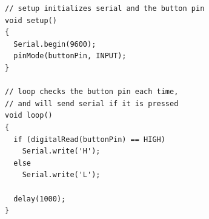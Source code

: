 \begin{description}
\begin{lstlisting}
// setup initializes serial and the button pin
void setup()
{
  Serial.begin(9600);
  pinMode(buttonPin, INPUT);
}

// loop checks the button pin each time,
// and will send serial if it is pressed
void loop()
{
  if (digitalRead(buttonPin) == HIGH)
    Serial.write('H');
  else
    Serial.write('L');
  
  delay(1000);
}
	\end{lstlisting}
\end{description}
